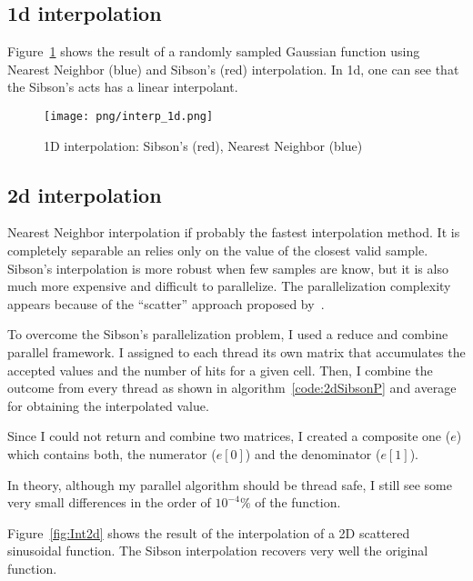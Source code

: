 \documentclass[10pt]{article}
\begin{document}
\subsection{1d interpolation}
Figure~\ref{fig:1dInt} shows the result of a randomly sampled Gaussian function
using Nearest Neighbor (blue) and Sibson's (red) interpolation. In 1d, one can
see that the Sibson's acts has a linear interpolant.

\begin{figure}[ht!]
  \centering
  \texttt{[image: png/interp\_1d.png]}
  \caption{1D interpolation: Sibson's (red), Nearest Neighbor (blue)}
  \label{fig:1dInt}
\end{figure}



\subsection{2d interpolation}

Nearest Neighbor interpolation if probably the fastest interpolation method. It
is completely separable an relies only on the value of the closest valid sample. 
Sibson's interpolation is more robust when few samples are know, but it is also
much more expensive and difficult to parallelize. The parallelization complexity
appears because of the ``scatter'' approach proposed by~\cite{park}. 

To overcome the Sibson's parallelization problem, I used a reduce and combine 
parallel framework. I assigned to each thread its own matrix that accumulates
the accepted values and the number of hits for a given cell. Then, I combine
the outcome from every thread as shown in algorithm~\ref{code:2dSibsonP} and 
average for obtaining the interpolated value.

Since I could not return and combine two matrices, I created a composite one ($e$)
which contains both, the numerator ($e[0]$) and the denominator ($e[1]$).

In theory, although my parallel algorithm should be thread safe, I still see some very small
differences in the order of $10^{-4}\%$ of the function.

Figure~\ref{fig:Int2d} shows the result of the interpolation of a 2D scattered 
sinusoidal function. The Sibson interpolation recovers very well the original function.
\end{document}
